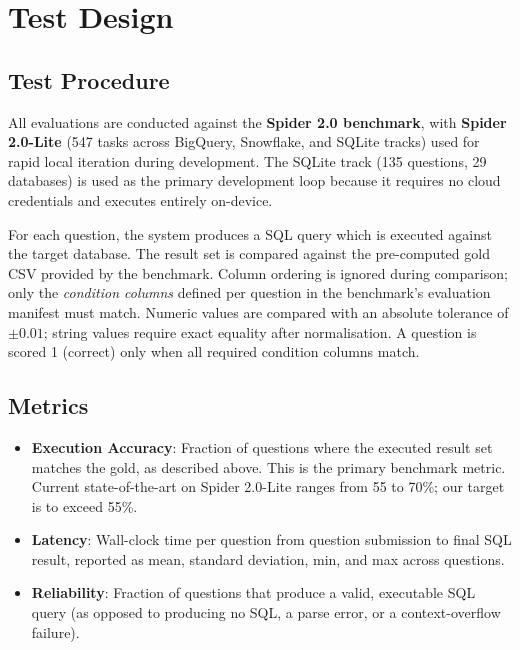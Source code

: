 \section{Test Design}
\subsection{Test Procedure}

All evaluations are conducted against the \textbf{Spider 2.0 benchmark}, with \textbf{Spider 2.0-Lite} (547 tasks across BigQuery, Snowflake, and SQLite tracks) used for rapid local iteration during development. The SQLite track (135 questions, 29 databases) is used as the primary development loop because it requires no cloud credentials and executes entirely on-device.

For each question, the system produces a SQL query which is executed against the target database. The result set is compared against the pre-computed gold CSV provided by the benchmark. Column ordering is ignored during comparison; only the \emph{condition columns} defined per question in the benchmark's evaluation manifest must match. Numeric values are compared with an absolute tolerance of $\pm 0.01$; string values require exact equality after normalisation. A question is scored 1 (correct) only when all required condition columns match.

\subsection{Metrics}

\begin{itemize}
    \item \textbf{Execution Accuracy}: Fraction of questions where the executed result set matches the gold, as described above. This is the primary benchmark metric. Current state-of-the-art on Spider 2.0-Lite ranges from 55 to 70\%; our target is to exceed 55\%.
    \item \textbf{Latency}: Wall-clock time per question from question submission to final SQL result, reported as mean, standard deviation, min, and max across questions.
    \item \textbf{Reliability}: Fraction of questions that produce a valid, executable SQL query (as opposed to producing no SQL, a parse error, or a context-overflow failure).
\end{itemize}

\begin{table}[H]
  \centering
  \caption{Result metrics table}
  \label{tab:results}
\end{table}

